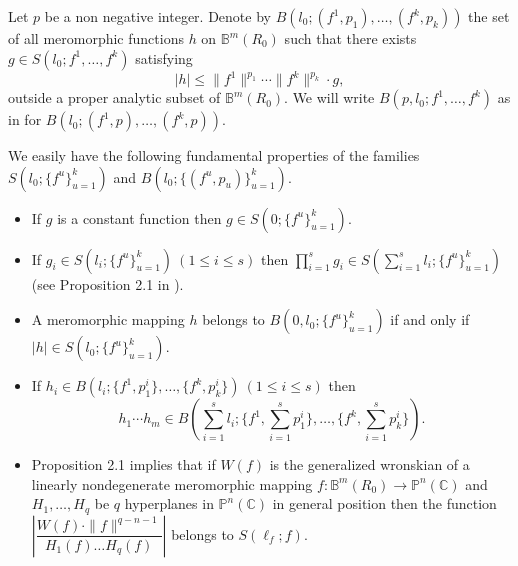\documentclass[12pt, a4paper, oneside]{amsart}
\newcommand{\C}{{\mathbb{C}}}
\newcommand{\B}{\mathbb{B}}
\renewcommand{\P}{{\mathbb{P}}}
\numberwithin{equation}{section}
\begin{document}
Let $p$ be a non negative integer. Denote by $B(l_0;(f^1,p_1),\ldots,(f^k,p_k))$ the set of all meromorphic functions $h$ on $\B^m(R_0)$ such that there exists $g\in S(l_0;f^1,\ldots,f^k)$ satisfying
$$|h|\le \|f^1\|^{p_1}\cdots \|f^k\|^{p_k}\cdot g,$$
outside a proper analytic subset of $\B^m(R_0)$. We will write $B(p,l_0;f^1,\ldots,f^k)$ as in \cite{Q21} for $B(l_0;(f^1,p),\ldots,(f^k,p))$.  

We easily have the following fundamental properties of the families $S(l_0;\{f^u\}_{u=1}^k)$ and $B(l_0;\{(f^u,p_u)\}_{u=1}^k)$.
\begin{itemize}
\item If $g$ is a constant function then $g\in S(0;\{f^u\}_{u=1}^k)$.
\item If $g_i\in S(l_i;\{f^u\}_{u=1}^k)\ (1\le i\le s)$ then $\prod_{i=1}^sg_i\in S(\sum_{i=1}^sl_i;\{f^u\}_{u=1}^k)$ (see Proposition 2.1 in \cite{Q21}).
\item A meromorphic mapping $h$ belongs to $B(0,l_0;\{f^u\}_{u=1}^k)$ if and only if $|h|\in S(l_0;\{f^u\}_{u=1}^k)$.
\item If $h_i\in B(l_i;\{f^1,p^i_1\},\ldots,\{f^k,p^i_k\})\ (1\le i\le s)$ then 
$$h_1\cdots h_m\in B(\sum_{i=1}^sl_i;\{f^1,\sum_{i=1}^sp^i_1\},\ldots,\{f^k,\sum_{i=1}^sp^i_k\}).$$
\item Proposition 2.1 implies that if $W(f)$ is the generalized wronskian of a linearly nondegenerate meromorphic mapping $f:\B^m(R_0)\to\P^n(\C)$  and $H_1,\ldots,H_q$ be $q$ hyperplanes in $\P^n(\C)$ in general position then the function $\left |\dfrac{W(f)\cdot\|f\|^{q-n-1}}{H_1(f)\ldots H_{q}(f)}\right |$ belongs to $S(\ell_f;f)$.
\end{itemize}
\end{document}

